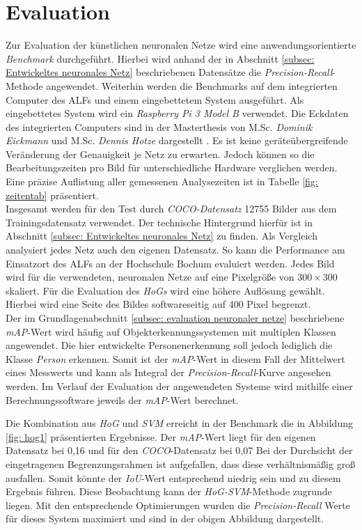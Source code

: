 \chapter{Evaluation}
\label{ch: Verifikation}
Zur Evaluation der künstlichen neuronalen Netze wird eine anwendungsorientierte \textit{Benchmark} durchgeführt. Hierbei wird anhand der in Abschnitt \ref{subsec: Entwickeltes neuronales Netz} beschriebenen Datensätze die \textit{Precision-Recall}-Methode angewendet. Weiterhin werden die Benchmarks auf dem integrierten Computer des ALFs und einem eingebettetem System ausgeführt. Als eingebettetes System wird ein \textit{Raspberry Pi 3 Model B} verwendet. Die Eckdaten des integrierten Computers sind in der Masterthesis von M.Sc. \textit{Dominik Eickmann} und M.Sc. \textit{Dennis Hotze} dargestellt \cite{alf}. Es ist keine geräteübergreifende Veränderung der Genauigkeit je Netz zu erwarten. Jedoch können so die Bearbeitungszeiten pro Bild für unterschiedliche Hardware verglichen werden. Eine präzise Auflistung aller gemessenen Analysezeiten ist in Tabelle \ref{fig: zeitentab} präsentiert. \\

Insgesamt werden für den Test durch \textit{COCO-Datensatz} 12755 Bilder aus dem Trainingsdatensatz verwendet. Der technische Hintergrund hierfür ist in Abschnitt \ref{subsec: Entwickeltes neuronales Netz} zu finden. Als Vergleich analysiert jedes Netz auch den eigenen Datensatz. So kann die Performance am Einsatzort des ALFs an der Hochschule Bochum evaluiert werden. Jedes Bild wird für die verwendeten, neuronalen Netze auf eine Pixelgröße von $300 \times 300$ skaliert. Für die Evaluation des \textit{HoGs} wird eine höhere Auflösung gewählt. Hierbei wird eine Seite des Bildes softwareseitig auf 400 Pixel begrenzt. \\

Der im Grundlagenabschnitt \ref{subsec: evaluation neuronaler netze} beschriebene \textit{mAP}-Wert wird häufig auf Objekterkennungssystemen mit multiplen Klassen angewendet. Die hier entwickelte Personenerkennung soll jedoch lediglich die Klasse \textit{Person} erkennen. Somit ist der \textit{mAP}-Wert in diesem Fall der Mittelwert eines Messwerts und kann als Integral der \textit{Precision-Recall}-Kurve angesehen werden. Im Verlauf der Evaluation der angewendeten Systeme wird mithilfe einer Berechnungssoftware jeweils der \textit{mAP}-Wert berechnet.
 


Die Kombination aus \textit{HoG} und \textit{SVM} erreicht in der Benchmark die in Abbildung \ref{fig: hog1} präsentierten Ergebnisse. Der \textit{mAP}-Wert liegt für den eigenen Datensatz bei 0,16 und für den \textit{COCO}-Datensatz bei 0,07 Bei der Durchsicht der eingetragenen Begrenzungsrahmen ist aufgefallen, dass diese verhältnismäßig groß ausfallen. Somit könnte der \textit{IoU}-Wert entsprechend niedrig sein und zu diesem Ergebnis führen. Diese Beobachtung kann der \textit{HoG-SVM}-Methode zugrunde liegen. Mit den entsprechende Optimierungen wurden die \textit{Precision-Recall} Werte für dieses System maximiert und sind in der obigen Abbildung dargestellt.


